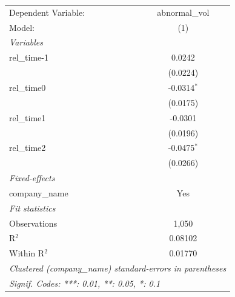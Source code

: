 
\begingroup
\centering
\begin{tabular}{lc}
   \tabularnewline \midrule \midrule
   Dependent Variable: & abnormal\_vol\\   
   Model:              & (1)\\  
   \midrule
   \emph{Variables}\\
   rel\_time-1         & 0.0242\\   
                       & (0.0224)\\   
   rel\_time0          & -0.0314$^{*}$\\   
                       & (0.0175)\\   
   rel\_time1          & -0.0301\\   
                       & (0.0196)\\   
   rel\_time2          & -0.0475$^{*}$\\   
                       & (0.0266)\\   
   \midrule
   \emph{Fixed-effects}\\
   company\_name       & Yes\\  
   \midrule
   \emph{Fit statistics}\\
   Observations        & 1,050\\  
   R$^2$               & 0.08102\\  
   Within R$^2$        & 0.01770\\  
   \midrule \midrule
   \multicolumn{2}{l}{\emph{Clustered (company\_name) standard-errors in parentheses}}\\
   \multicolumn{2}{l}{\emph{Signif. Codes: ***: 0.01, **: 0.05, *: 0.1}}\\
\end{tabular}
\par\endgroup


